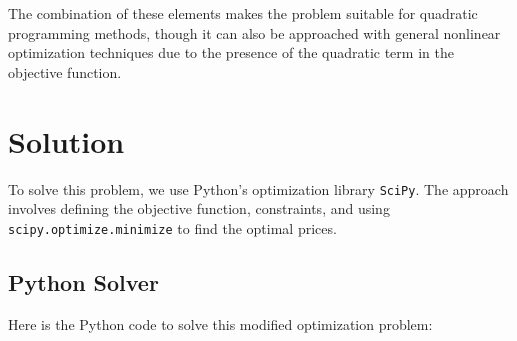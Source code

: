 \documentclass{article}
\begin{document}
The combination of these elements makes the problem suitable for quadratic programming methods, though it can also be approached with general nonlinear optimization techniques due to the presence of the quadratic term in the objective function.

\section*{Solution}

To solve this problem, we use Python's optimization library \texttt{SciPy}. The approach involves defining the objective function, constraints, and using \texttt{scipy.optimize.minimize} to find the optimal prices.

\subsection*{Python Solver}

Here is the Python code to solve this modified optimization problem:
\end{document}
